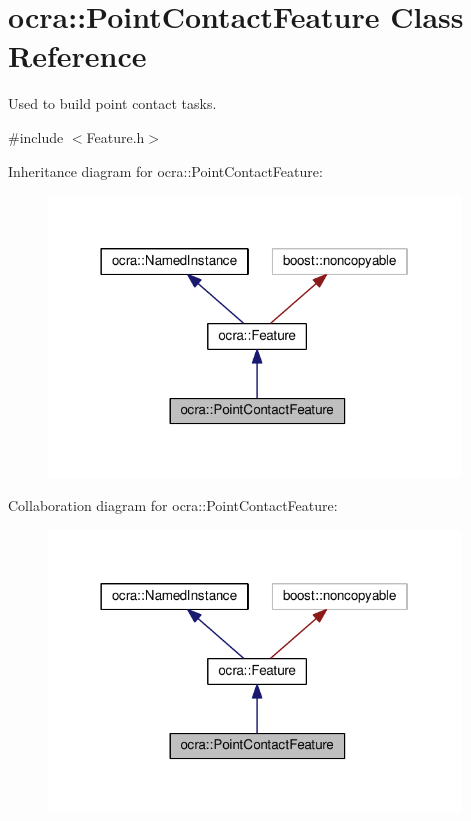 \hypertarget{classocra_1_1PointContactFeature}{}\section{ocra\+:\+:Point\+Contact\+Feature Class Reference}
\label{classocra_1_1PointContactFeature}


Used to build point contact tasks.  




{\ttfamily \#include $<$Feature.\+h$>$}



Inheritance diagram for ocra\+:\+:Point\+Contact\+Feature\+:
\nopagebreak
\begin{figure}[H]
\begin{center}
\leavevmode
\includegraphics[width=310pt]{dc/dca/classocra_1_1PointContactFeature__inherit__graph}
\end{center}
\end{figure}


Collaboration diagram for ocra\+:\+:Point\+Contact\+Feature\+:
\nopagebreak
\begin{figure}[H]
\begin{center}
\leavevmode
\includegraphics[width=310pt]{d6/d45/classocra_1_1PointContactFeature__coll__graph}
\end{center}
\end{figure}
